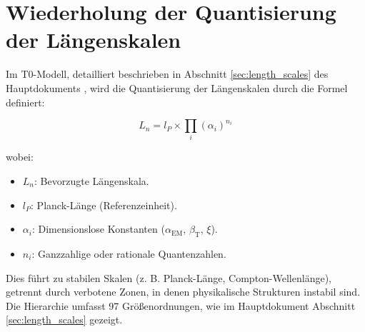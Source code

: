 \documentclass[12pt,a4paper]{article}
\newcommand{\alphaEM}{\alpha_{\text{EM}}}
\newcommand{\betaT}{\beta_{\text{T}}}
\begin{document}
	\section{Wiederholung der Quantisierung der Längenskalen}
	\label{sec:wiederholung_quantisierung}
	
	Im T0-Modell, detailliert beschrieben in Abschnitt \ref{sec:length_scales} des Hauptdokuments \cite{pascher_nateinheiten_2025}, wird die Quantisierung der Längenskalen durch die Formel definiert:
	
	\begin{equation}
		L_n = l_P \times \prod_{i} (\alpha_i)^{n_i}
	\end{equation}
	
	wobei:
	\begin{itemize}
		\item $L_n$: Bevorzugte Längenskala.
		\item $l_P$: Planck-Länge (Referenzeinheit).
		\item $\alpha_i$: Dimensionslose Konstanten (\(\alphaEM\), \(\betaT\), \(\xi\)).
		\item $n_i$: Ganzzahlige oder rationale Quantenzahlen.
	\end{itemize}
	
	Dies führt zu stabilen Skalen (z. B. Planck-Länge, Compton-Wellenlänge), getrennt durch verbotene Zonen, in denen physikalische Strukturen instabil sind. Die Hierarchie umfasst 97 Größenordnungen, wie im Hauptdokument Abschnitt \ref{sec:length_scales} gezeigt.
	
\end{document}
